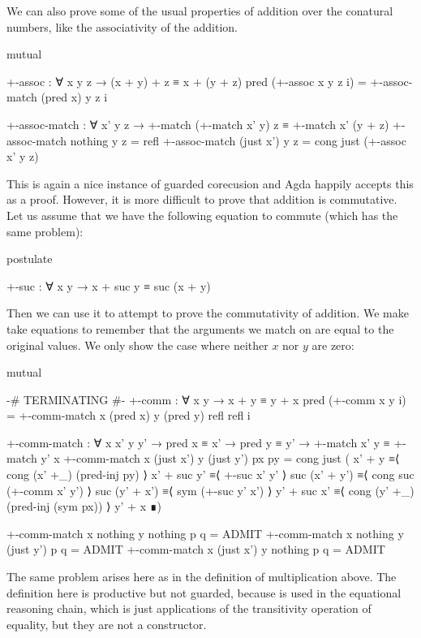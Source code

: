 We can also prove some of the usual properties of addition over the conatural
numbers, like the associativity of the addition.
\begin{code}[hide]
mutual
\end{code}
\begin{code}
  +-assoc : ∀ x y z → (x + y) + z ≡ x + (y + z)
  pred (+-assoc x y z i) = +-assoc-match (pred x) y z i

  +-assoc-match :
    ∀ x' y z →
    +-match (+-match x' y) z ≡ +-match x' (y + z)
  +-assoc-match nothing    y z = refl
  +-assoc-match (just x')  y z = cong just (+-assoc x' y z)
\end{code}
This is again a nice instance of guarded corecusion and Agda happily accepts
this as a proof. However, it is more difficult to prove that addition is
commutative. Let us assume that we have the following equation to commute
 (which has the same problem):
\begin{code}[hide]
postulate
\end{code}
\begin{code}
  +-suc : ∀ x y → x + suc y ≡ suc (x + y)
\end{code}
Then we can use it to attempt to prove the commutativity of addition. We make
 take equations to remember that the arguments we
match on are equal to the original values. We only show the case where neither
$x$ nor $y$ are zero:
\begin{code}[hide]
mutual
\end{code}
\begin{code}
  {-# TERMINATING #-}
  +-comm : ∀ x y → x + y ≡ y + x
  pred (+-comm x y i) =
    +-comm-match x (pred x) y (pred y) refl refl i

  +-comm-match :
    ∀ x x' y y' → pred x ≡ x' → pred y ≡ y' →
    +-match x' y ≡ +-match y' x
  +-comm-match x (just x') y (just y') px py =
    cong just
      (  x' + y         ≡⟨ cong (x' +_) (pred-inj py) ⟩
         x' + suc y'    ≡⟨ +-suc x' y' ⟩
         suc (x' + y')  ≡⟨ cong suc (+-comm x' y') ⟩
         suc (y' + x')  ≡⟨ sym (+-suc y' x') ⟩
         y' + suc x'    ≡⟨ cong (y' +_) (pred-inj (sym px)) ⟩
         y' + x         ∎)
\end{code}
\begin{code}[hide]
  +-comm-match x nothing y nothing p q = ADMIT
  +-comm-match x nothing y (just y') p q = ADMIT
  +-comm-match x (just x') y nothing p q = ADMIT
\end{code}
The same problem arises here as in the definition of multiplication above. The
definition here is productive but not guarded, because  is
used in the equational reasoning chain, which is just applications of the
transitivity operation of equality, but they are not a constructor.
